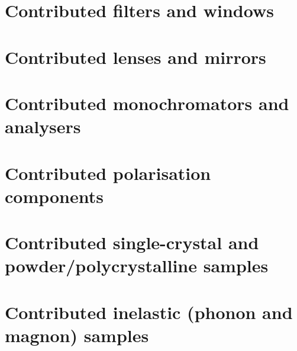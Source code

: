 \section{Contributed filters and windows}




\section{Contributed lenses and mirrors}








\section{Contributed monochromators and analysers}






\section{Contributed polarisation components}











\section{Contributed single-crystal and powder/polycrystalline samples}





\section{Contributed inelastic (phonon and magnon) samples}



